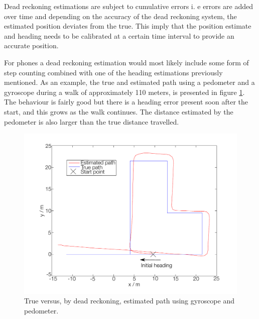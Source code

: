 \documentclass{LTHthesis}
\begin{document}
Dead reckoning estimations are subject to cumulative errors i. e errors are added over time and depending on the accuracy of the dead reckoning system, the estimated position deviates from the true. This imply that the position estimate and heading needs to be calibrated at a certain time interval to provide an  accurate position.

For phones a dead reckoning estimation would most likely include some form of step counting combined with one of the heading estimations previously mentioned. As an example, the true and estimated path using a pedometer and a gyroscope during a walk of approximately 110 meters, is presented in figure \ref{deadreckon_1}. The behaviour is fairly good but there is a heading error present soon after the start, and this grows as the walk continues. The distance estimated by the pedometer is also larger than the true distance travelled.  
%
\begin{figure}[!hbt]

\includegraphics[width=1\textwidth ]{images/kinematic/deadreckon_1}
\caption{True versus, by dead reckoning, estimated path using gyroscope and pedometer.}\label{deadreckon_1}
\end{figure}
\end{document}
